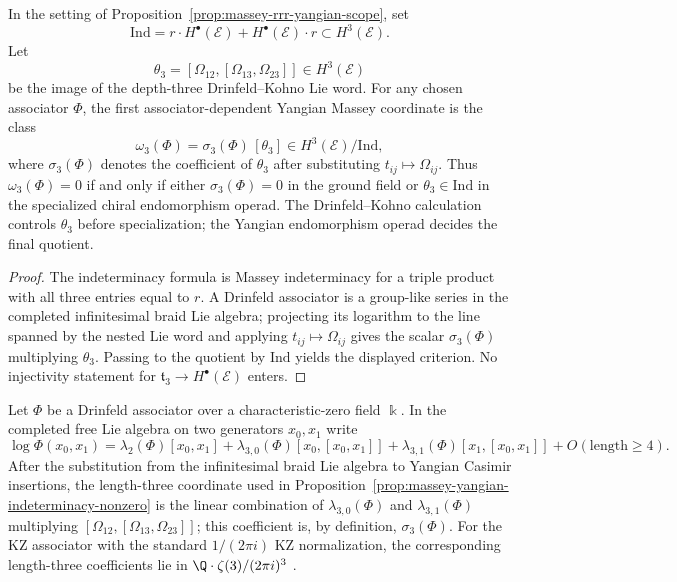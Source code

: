 \begin{proposition}%
\label{prop:massey-yangian-indeterminacy-nonzero}%
%
%
In the setting of Proposition~\ref{prop:massey-rrr-yangian-scope},
set
\[
 \mathrm{Ind}
 =
 r\cdot H^\bullet(\mathcal{E})+
 H^\bullet(\mathcal{E})\cdot r
 \subset H^3(\mathcal{E}).
\]
Let
\[
\theta_3=[\Omega_{12},[\Omega_{13},\Omega_{23}]]
\in H^3(\mathcal E)
\]
be the image of the depth-three Drinfeld--Kohno Lie word. For any
chosen associator $\Phi$, the first associator-dependent Yangian
Massey coordinate is the class
\[
\omega_3(\Phi)
=
\sigma_3(\Phi)\,[\theta_3]
\in H^3(\mathcal E)/\mathrm{Ind},
\]
where $\sigma_3(\Phi)$ denotes the coefficient of $\theta_3$ after
substituting $t_{ij}\mapsto\Omega_{ij}$. Thus
$\omega_3(\Phi)=0$ if and only if either $\sigma_3(\Phi)=0$ in the
ground field or $\theta_3\in\mathrm{Ind}$ in the specialized chiral
endomorphism operad. The Drinfeld--Kohno calculation controls
$\theta_3$ before specialization; the Yangian endomorphism operad
decides the final quotient.
\end{proposition}

\begin{proof}
The indeterminacy formula is Massey indeterminacy for a triple
product with all three entries equal to $r$. A Drinfeld associator is
a group-like series in the completed infinitesimal braid Lie algebra;
projecting its logarithm to the line spanned by the nested Lie word
and applying $t_{ij}\mapsto\Omega_{ij}$ gives the scalar
$\sigma_3(\Phi)$ multiplying $\theta_3$. Passing to the quotient by
$\mathrm{Ind}$ yields the displayed criterion. No injectivity statement
for $\mathfrak t_3\to H^\bullet(\mathcal E)$ enters.
\end{proof}

\begin{proposition}%
\label{prop:yangian-associator-order-3}%
%
%
Let $\Phi$ be a Drinfeld associator over a characteristic-zero field
$\Bbbk$. In the completed free Lie algebra on two generators
$x_0,x_1$ write
\[
\log\Phi(x_0,x_1)
=
\lambda_2(\Phi)[x_0,x_1]
+\lambda_{3,0}(\Phi)[x_0,[x_0,x_1]]
+\lambda_{3,1}(\Phi)[x_1,[x_0,x_1]]
+O(\mathrm{length}\ge4).
\]
After the substitution from the infinitesimal braid Lie algebra to
Yangian Casimir insertions, the length-three coordinate used in
Proposition~\ref{prop:massey-yangian-indeterminacy-nonzero} is the
linear combination of $\lambda_{3,0}(\Phi)$ and
$\lambda_{3,1}(\Phi)$ multiplying
$[\Omega_{12},[\Omega_{13},\Omega_{23}]]$; this coefficient is, by
definition, $\sigma_3(\Phi)$. For the KZ associator with the standard
$1/(2\pi i)$ KZ normalization, the corresponding length-three
coefficients lie in
$\Q\cdot \zeta(3)/(2\pi i)^3$ \cite{Drinfeld90QuasiHopf,Kontsevich1999}.
\end{proposition}

